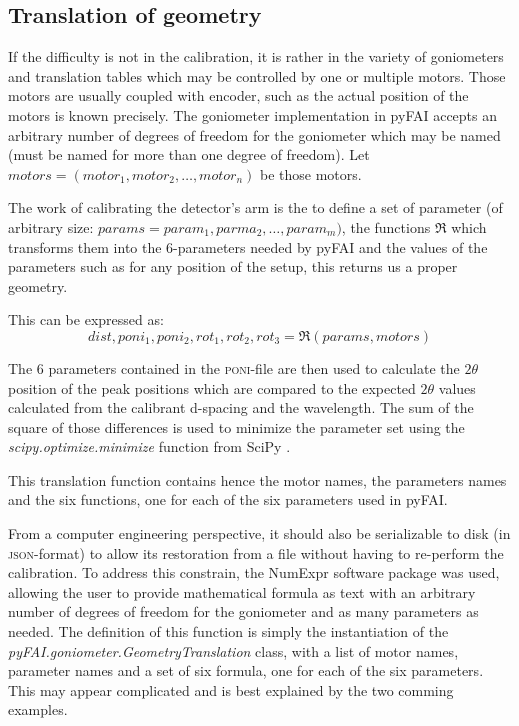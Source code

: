 \documentclass[preprint, pdf]{iucr}              %
\begin{document}
\subsection{Translation of geometry}

If the difficulty is not in the calibration, it is  rather in the variety of
goniometers and translation tables which may be controlled by one or multiple
motors.
Those motors are usually coupled with encoder, such as the actual position of
the motors is known precisely.
The goniometer implementation in pyFAI accepts an
arbitrary number of degrees of freedom for the goniometer which may be named 
(must be named for more than one degree of freedom). 
Let $motors = (motor_1, motor_2, \ldots, motor_n)$ be those motors. 

The work of calibrating the detector's arm is the to define a set of parameter
(of arbitrary size: $params = param_1, parma_2, \ldots, param_m)$, the
functions $\Re$ which transforms them into the 6-parameters needed by pyFAI and 
the values of the parameters such as for any position of the setup, this returns
us a proper geometry.

This can be expressed as:
$$
dist, poni_1, poni_2, rot_1, rot_2, rot_3 = \Re(params, motors) $$

The 6 parameters contained in the \textsc{poni}-file  are then used to calculate
the $2\theta$ position of the peak positions which are compared to the expected $2\theta$
values calculated from the calibrant d-spacing and the wavelength. 
The sum of the square of those differences is used to minimize the parameter set
using the \textit{scipy.optimize.minimize} function from SciPy \cite{scipy}.

This translation function contains hence the motor names, the parameters names
and the six functions, one for each of the six parameters used in pyFAI. 

From a computer engineering perspective, it should also be serializable to 
disk (in \textsc{json}-format) to allow its restoration from a file without
having to re-perform the calibration. 
To address this constrain, the NumExpr software package \cite{numexpr} was
used, allowing the user to provide mathematical formula as text with an
arbitrary number of degrees of freedom for the goniometer and as many parameters
as needed.
The definition of this function is simply the instantiation of the
\textit{pyFAI.goniometer.GeometryTranslation} class, with a list of motor
names, parameter names and a set of six formula, one for each of the six parameters. 
This may appear complicated and is best explained by the two comming examples.
\end{document}
